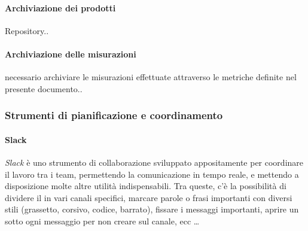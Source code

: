     		\paragraph{Archiviazione dei prodotti}
    		Repository..
    		
    		\paragraph{Archiviazione delle misurazioni}
    		necessario archiviare le misurazioni effettuate attraverso le metriche definite nel presente documento..
    		
    	\subsubsection{Strumenti di pianificazione e coordinamento}
    	
    		\paragraph{Slack} %
			\emph{Slack} è uno strumento di collaborazione sviluppato appositamente per coordinare il lavoro tra i team, permettendo la comunicazione in tempo
			reale, e mettendo a disposizione molte altre utilità indispensabili. Tra queste, c'è la possibilità di dividere il  in vari canali
			specifici, marcare parole o frasi importanti con diversi stili (grassetto, corsivo, codice, barrato), fissare i messaggi importanti, aprire un 
			sotto ogni messaggio per non creare  sul canale, ecc \dots

